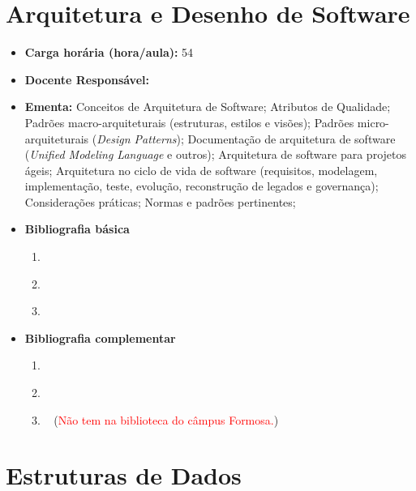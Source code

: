 \documentclass[11pt,fleqn]{book} %
\begin{document}
\section{Arquitetura e Desenho de Software}\label{disc:arqsoft}
\begin{itemize}
	\item \textbf{Carga horária (hora/aula):} 54
	\item \textbf{Docente Responsável:}~
	\item \textbf{Ementa:} 
	Conceitos de Arquitetura de Software;
	Atributos de Qualidade;
	Padrões macro-arquiteturais (estruturas, estilos e visões);
	Padrões micro-arquiteturais (\textit{Design Patterns});
	Documentação de arquitetura de software (\textit{Unified Modeling Language} e outros);
	Arquitetura de software para projetos ágeis;
	Arquitetura no ciclo de vida de software (requisitos, modelagem, implementação, teste, evolução, reconstrução de legados e governança);
	Considerações práticas;
	Normas e padrões pertinentes;
	
	\item \textbf{Bibliografia básica}
	\begin{enumerate}
		\item ~\cite{sommerville2011engenharia}
		\item ~\cite{pressman2016engenharia}
		\item ~\cite{booch2012uml}
	\end{enumerate}
	\item \textbf{Bibliografia complementar}
	\begin{enumerate}
		\item ~\cite{wazlawick2011analise}
		\item ~\cite{larman2007utilizando}
		\item ~\cite{prikladnicki2014metodos} (\textcolor{red}{Não tem na biblioteca do câmpus Formosa.})
	\end{enumerate}
\end{itemize}



\newpage
\section{Estruturas de Dados}\label{disc:estruturadedados}
\end{document}
